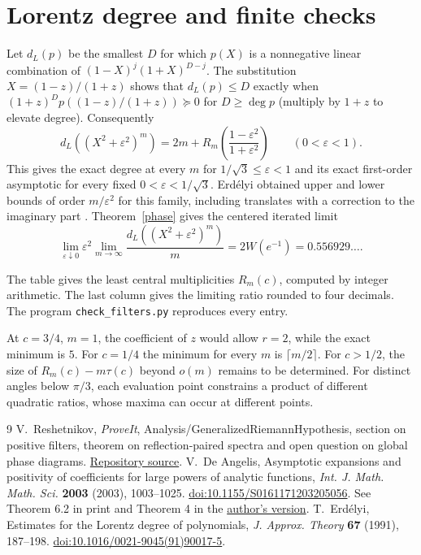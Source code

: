 \documentclass[11pt]{article}
\newcommand{\coef}{\succeq 0}
\begin{document}
\section{Lorentz degree and finite checks}

Let $d_L(p)$ be the smallest $D$ for which $p(X)$ is a nonnegative linear combination of $(1-X)^j(1+X)^{D-j}$. The substitution $X=(1-z)/(1+z)$ shows that $d_L(p)\le D$ exactly when $(1+z)^Dp((1-z)/(1+z))\coef$ for $D\ge\deg p$ (multiply by $1+z$ to elevate degree). Consequently
\[
 d_L((X^2+\varepsilon^2)^m)=2m+R_m\!\left(\frac{1-\varepsilon^2}{1+\varepsilon^2}\right)
 \qquad(0<\varepsilon<1).
\]
This gives the exact degree at every $m$ for $1/\sqrt 3\le\varepsilon<1$ and its exact first-order asymptotic for every fixed $0<\varepsilon<1/\sqrt3$. Erd\'elyi obtained upper and lower bounds of order $m/\varepsilon^2$ for this family, including translates with a correction to the imaginary part \cite{erd}. Theorem~\ref{phase} gives the centered iterated limit
\[
 \lim_{\varepsilon\downarrow0}\varepsilon^2\lim_{m\to\infty}
 \frac{d_L((X^2+\varepsilon^2)^m)}m =2W(e^{-1})=0.556929\ldots .
\]

The table gives the least central multiplicities $R_m(c)$, computed by integer arithmetic. The last column gives the limiting ratio rounded to four decimals. The program \texttt{check\_filters.py} reproduces every entry.
\begin{center}\end{center}
At $c=3/4$, $m=1$, the coefficient of $z$ would allow $r=2$, while the exact minimum is $5$. For $c=1/4$ the minimum for every $m$ is $\lceil m/2\rceil$. For $c>1/2$, the size of $R_m(c)-m\tau(c)$ beyond $o(m)$ remains to be determined. For distinct angles below $\pi/3$, each evaluation point constrains a product of different quadratic ratios, whose maxima can occur at different points.

\begin{thebibliography}{9}
 V.~Reshetnikov, \emph{ProveIt}, Analysis/GeneralizedRiemannHypothesis, section on positive filters, theorem on reflection-paired spectra and open question on global phase diagrams. \href{https://github.com/VladimirReshetnikov/ProveIt/blob/41a284d6ef8eb16d783bfc685ab99cc6e1d28daa/Analysis/GeneralizedRiemannHypothesis/Article/sections/fil.tex}{Repository source}.
 V.~De Angelis, Asymptotic expansions and positivity of coefficients for large powers of analytic functions, \emph{Int. J. Math. Math. Sci.} \textbf{2003} (2003), 1003--1025. \href{https://doi.org/10.1155/S0161171203205056}{doi:10.1155/S0161171203205056}. See Theorem 6.2 in print and Theorem 4 in the \href{https://vdeangel.xula.edu/Publications/asy.pdf}{author's version}.
 T.~Erd\'elyi, Estimates for the Lorentz degree of polynomials, \emph{J. Approx. Theory} \textbf{67} (1991), 187--198. \href{https://doi.org/10.1016/0021-9045(91)90017-5}{doi:10.1016/0021-9045(91)90017-5}.
\end{thebibliography}
\end{document}
